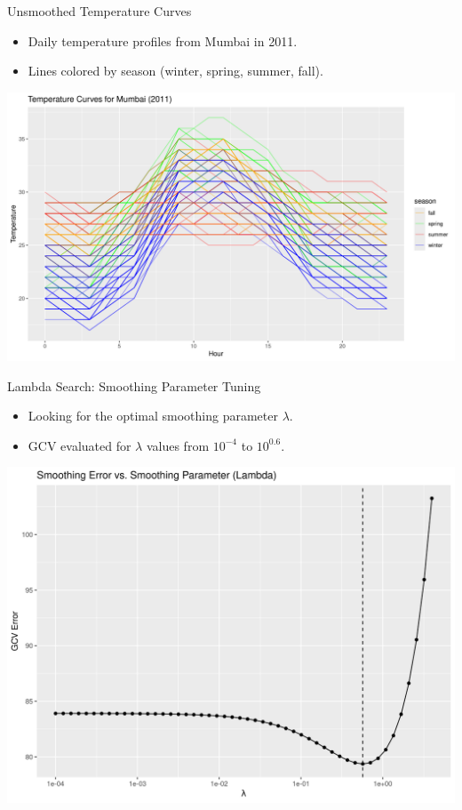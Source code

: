 \documentclass[svgnames, 12pt]{beamer}
\begin{document}
\begin{frame}{Unsmoothed Temperature Curves}
	\begin{itemize}
		\item Daily temperature profiles from Mumbai in 2011.
			\item Lines colored by season (winter, spring, summer, fall).
		\end{itemize}
	\begin{center}
		\includegraphics[width=0.8\linewidth]{../notebooks/assets/unsmoothed_temperature_curves.png}
	\end{center}
\end{frame}

\begin{frame}{Lambda Search: Smoothing Parameter Tuning}
    \begin{itemize}
        \item Looking for the optimal smoothing parameter \(\lambda\).
		\item GCV evaluated for \(\lambda\) values from \(10^{-4}\) to \(10^{0.6}\).
    \end{itemize}
    \vfill
    \begin{center}
        \includegraphics[width=0.7\linewidth]{../notebooks/assets/lambda_vs_gcv.png}
    \end{center}
\end{frame}
\end{document}

